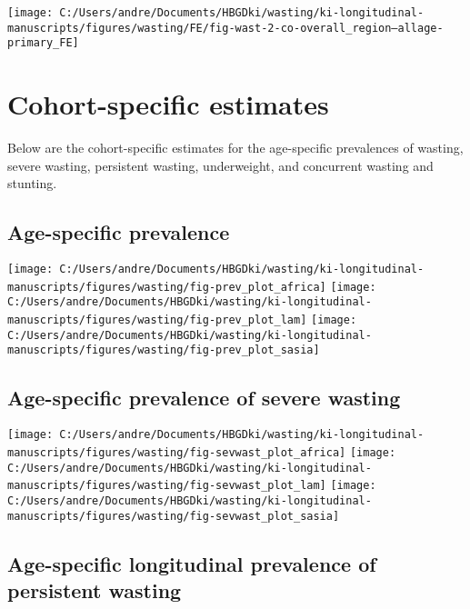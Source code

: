 \documentclass[
  9pt,
]{book}
\begin{document}
\texttt{[image: C:/Users/andre/Documents/HBGDki/wasting/ki-longitudinal-manuscripts/figures/wasting/FE/fig-wast-2-co-overall\_region--allage-primary\_FE]}

\hypertarget{cohort}{%
\chapter{Cohort-specific estimates}\label{cohort}}

\raggedright

Below are the cohort-specific estimates for the age-specific prevalences of wasting, severe wasting, persistent wasting, underweight, and concurrent wasting and stunting.

\hypertarget{age-specific-prevalence-1}{%
\section{Age-specific prevalence}\label{age-specific-prevalence-1}}

\texttt{[image: C:/Users/andre/Documents/HBGDki/wasting/ki-longitudinal-manuscripts/figures/wasting/fig-prev\_plot\_africa]}
\texttt{[image: C:/Users/andre/Documents/HBGDki/wasting/ki-longitudinal-manuscripts/figures/wasting/fig-prev\_plot\_lam]}
\texttt{[image: C:/Users/andre/Documents/HBGDki/wasting/ki-longitudinal-manuscripts/figures/wasting/fig-prev\_plot\_sasia]}

\hypertarget{age-specific-prevalence-of-severe-wasting-1}{%
\section{Age-specific prevalence of severe wasting}\label{age-specific-prevalence-of-severe-wasting-1}}

\texttt{[image: C:/Users/andre/Documents/HBGDki/wasting/ki-longitudinal-manuscripts/figures/wasting/fig-sevwast\_plot\_africa]}
\texttt{[image: C:/Users/andre/Documents/HBGDki/wasting/ki-longitudinal-manuscripts/figures/wasting/fig-sevwast\_plot\_lam]}
\texttt{[image: C:/Users/andre/Documents/HBGDki/wasting/ki-longitudinal-manuscripts/figures/wasting/fig-sevwast\_plot\_sasia]}

\hypertarget{age-specific-longitudinal-prevalence-of-persistent-wasting-1}{%
\section{Age-specific longitudinal prevalence of persistent wasting}\label{age-specific-longitudinal-prevalence-of-persistent-wasting-1}}
\end{document}
